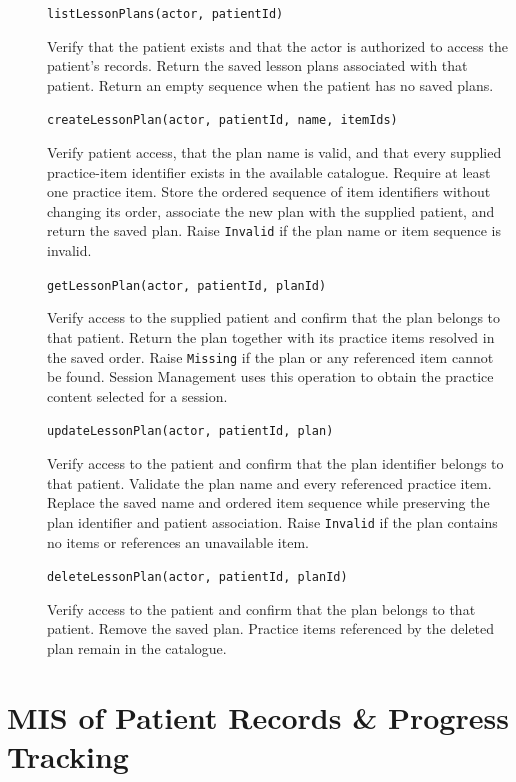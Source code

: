 \documentclass[12pt, titlepage]{article}
\begin{document}
\begin{description}
\item[] \texttt{listLessonPlans(actor, patientId)}\par
Verify that the patient exists and that the actor is authorized to access
the patient's records. Return the saved lesson plans associated with that
patient. Return an empty sequence when the patient has no saved plans.

\item[] \texttt{createLessonPlan(actor, patientId, name, itemIds)}\par
Verify patient access, that the plan name is valid, and that every supplied
practice-item identifier exists in the available catalogue. Require at
least one practice item. Store the ordered sequence of item identifiers
without changing its order, associate the new plan with the supplied
patient, and return the saved plan. Raise \texttt{Invalid} if the plan name
or item sequence is invalid.

\item[] \texttt{getLessonPlan(actor, patientId, planId)}\par
Verify access to the supplied patient and confirm that the plan belongs to
that patient. Return the plan together with its practice items resolved in
the saved order. Raise \texttt{Missing} if the plan or any referenced item
cannot be found. Session Management uses this operation to obtain the
practice content selected for a session.

\item[] \texttt{updateLessonPlan(actor, patientId, plan)}\par
Verify access to the patient and confirm that the plan identifier belongs
to that patient. Validate the plan name and every referenced practice item.
Replace the saved name and ordered item sequence while preserving the plan
identifier and patient association. Raise \texttt{Invalid} if the plan
contains no items or references an unavailable item.

\item[] \texttt{deleteLessonPlan(actor, patientId, planId)}\par
Verify access to the patient and confirm that the plan belongs to that
patient. Remove the saved plan. Practice items referenced by the deleted
plan remain in the catalogue.
\end{description}


\clearpage
\section{MIS of Patient Records \& Progress Tracking} \label{mis:records}
\end{document}
